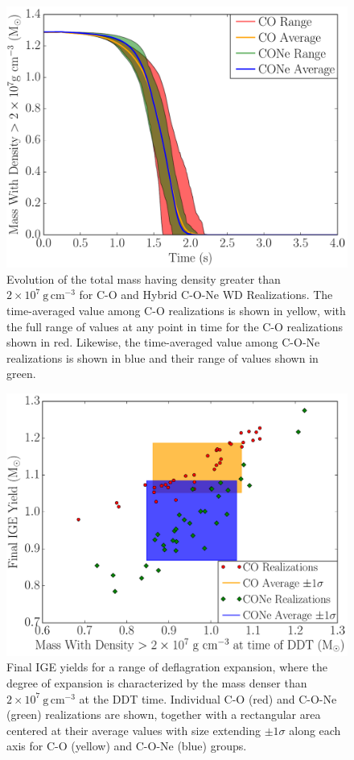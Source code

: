 \documentclass[iop,apj]{emulateapj}
\newcommand{\unitspace}{\ensuremath{\,}}
\newcommand{\usp}{\unitspace}
\newcommand{\unitstyle}[1]{\ensuremath{\mathrm{#1}}}
\newcommand{\power}[2]{\ensuremath{{#1}^{#2}}}
\newcommand{\centi}{\unitstyle{c}}
\newcommand{\meter}{\unitstyle{m}}
\newcommand{\cm}{\centi\meter}
\newcommand{\gram}{\unitstyle{g}}
\newcommand{\grampercc}{\gram\usp\power{\cm}{-3}} %
\begin{document}
\begin{figure}[!ht]
	\includegraphics[width=\linewidth]{figures/cf_shaded/mass_with_dens_gt_2e7.pdf}
	\caption{\label{fig:mass_dens_lt_2e7} Evolution of the total mass having density greater than $2 \times 10^7~\grampercc$ for C-O and Hybrid C-O-Ne WD Realizations. The time-averaged value among C-O realizations is shown in yellow, with the full range of values at any point in time for the C-O realizations shown in red. Likewise, the time-averaged value among C-O-Ne realizations is shown in blue and their range of values shown in green.}
\end{figure}

\begin{figure}[!ht]
	\includegraphics[width=\linewidth]{figures/compare/final_nse_mass_vs_high_density_mass_at_ddt.pdf}
	\caption{\label{fig:ige_vs_highrho_ddt} Final IGE yields for a range of deflagration expansion, where the degree of expansion is characterized by the mass denser than $2\times 10^7~\grampercc$ at the DDT time. Individual C-O (red) and C-O-Ne (green) realizations are shown, together with a rectangular area centered at their average values with size extending $\pm 1 \sigma$ along each axis for C-O (yellow) and C-O-Ne (blue) groups.}
\end{figure}
\end{document}
